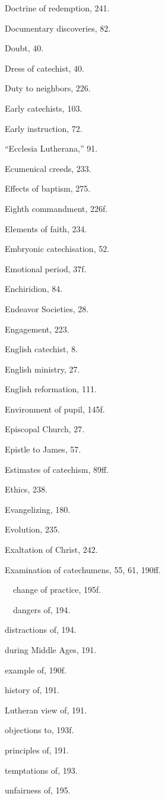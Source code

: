 \begin{originalinhalt}
Doctrine of redemption, 241.

Documentary discoveries, 82.

Doubt, 40.

Dress of catechist, 40.

Duty to neighbors, 226.


Early catechists, 103.

Early instruction, 72.

“Ecclesia Lutherana,” 91.

Ecumenical creeds, 233.

Effects of baptism, 275.

Eighth commandment, 226f.

Elements of faith, 234.

Embryonic catechisation, 52.

Emotional period, 37f.

Enchiridion, 84.

Endeavor Societies, 28.

Engagement, 223.

English catechist, 8.

English ministry, 27.

English reformation, 111.

Environment of pupil, 145f.

Episcopal Church, 27.

Epistle to James, 57.

Estimates of catechism, 89ff.

Ethics, 238.

Evangelizing, 180.

Evolution, 235.

Exaltation of Christ, 242.

Examination of catechumens, 55, 61, 190ff.

 change of practice, 195f.

 dangers of, 194.

distractions of, 194.

during Middle Ages, 191.

example of, 190f.

history of, 191.

Lutheran view of, 191.

objections to, 193f.

principles of, 191.

temptations of, 193.

unfairness of, 195.


\end{originalinhalt}
